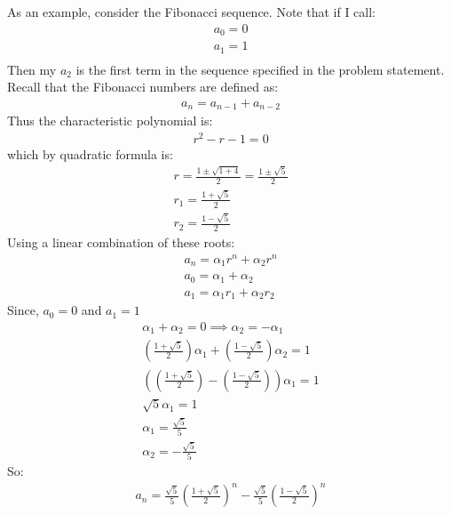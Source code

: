 \documentclass{article}
\begin{document}
As an example, consider the Fibonacci sequence. Note that if I call:
\begin{gather*}
	a_{0} = 0\\
	a_{1} = 1\\
\end{gather*}
Then my $a_{2}$ is the first term in the sequence specified in the problem statement. Recall that the Fibonacci numbers are defined as:
\begin{gather*}
	a_{n} = a_{n - 1} + a_{n - 2}
\end{gather*}
Thus the characteristic polynomial is:
\begin{gather*}
	r^{2} - r - 1 = 0
\end{gather*}
which by quadratic formula is:
\begin{gather*}
	r = \frac{1 \pm \sqrt{1 + 4}}{2} = \frac{1 \pm \sqrt{5}}{2}\\
	r_{1} = \frac{1 + \sqrt{5}}{2}\\
	r_{2} = \frac{1 - \sqrt{5}}{2}
\end{gather*}
Using a linear combination of these roots:
\begin{gather*}
	a_{n} = \alpha_{1}r^{n} + \alpha_{2}r^{n}\\
	a_{0} = \alpha_{1} + \alpha_{2}\\
	a_{1} = \alpha_{1}r_{1} + \alpha_{2}r_{2}
\end{gather*}
Since, $a_{0} = 0$ and $a_{1} = 1$
\begin{gather*}
	\alpha_{1} + \alpha_{2} = 0 \implies \alpha_{2} = -\alpha_{1}\\
	\left(\frac{1+\sqrt{5}}{2}\right)\alpha_{1} + \left(\frac{1 - \sqrt{5}}{2}\right)\alpha_{2} = 1\\
	\left(\left(\frac{1+\sqrt{5}}{2}\right) -\left(\frac{1 - \sqrt{5}}{2}\right)\right)\alpha_{1} = 1\\
	\sqrt{5}\alpha_{1} = 1\\
	\alpha_{1} = \frac{\sqrt{5}}{5}\\
	\alpha_{2} = -\frac{\sqrt{5}}{5}
\end{gather*}
So:
\begin{gather*}
	a_{n} = \frac{\sqrt{5}}{5}\left(\frac{1 + \sqrt{5}}{2}\right)^{n} -\frac{\sqrt{5}}{5}\left(\frac{1 - \sqrt{5}}{2}\right)^{n} 
\end{gather*}
\end{document}
